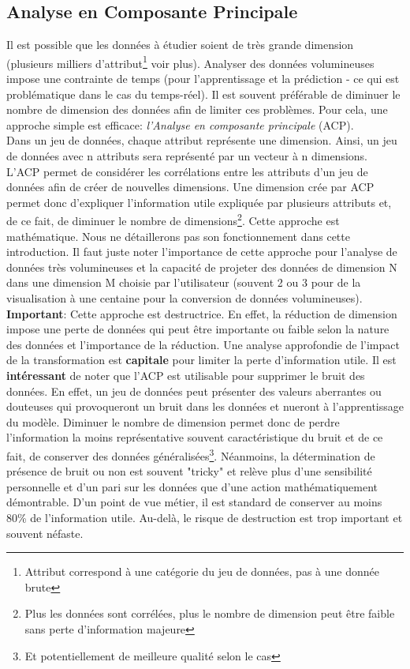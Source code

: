 \subsection{Analyse en Composante Principale}
Il est possible que les données à étudier soient de très grande dimension (plusieurs milliers d'attribut\footnote{Attribut correspond à une catégorie du jeu de données, pas à une donnée brute} voir plus). Analyser des données volumineuses impose une contrainte de temps (pour l'apprentissage et la prédiction - ce qui est problématique dans le cas du temps-réel). Il est souvent préférable de diminuer le nombre de dimension des données afin de limiter ces problèmes. Pour cela, une approche simple est efficace: \textit{l'Analyse en composante principale} (ACP). \\

\noindent Dans un jeu de données, chaque attribut représente une dimension. Ainsi, un jeu de données avec n attributs sera représenté par un vecteur à n dimensions. L'ACP permet de considérer les corrélations entre les attributs d'un jeu de données afin de créer de nouvelles dimensions. Une dimension crée par ACP permet donc d'expliquer l'information utile expliquée par plusieurs attributs et, de ce fait, de diminuer le nombre de dimensions\footnote{Plus les données sont corrélées, plus le nombre de dimension peut être faible sans perte d'information majeure}. Cette approche est mathématique. Nous ne détaillerons pas son fonctionnement dans cette introduction. Il faut juste noter l'importance de cette approche pour l'analyse de données très volumineuses et la capacité de projeter des données de dimension N dans une dimension M choisie par l'utilisateur (souvent 2 ou 3 pour de la visualisation à une centaine pour la conversion de données volumineuses).\\

 \noindent \textbf{Important}: Cette approche est destructrice. En effet, la réduction de dimension impose une perte de données qui peut être importante ou faible selon la nature des données et l'importance de la réduction. Une analyse approfondie de l'impact de la transformation est \textbf{capitale} pour limiter la perte d'information utile. Il est \textbf{intéressant} de noter que l'ACP est utilisable pour supprimer le bruit des données. En effet, un jeu de données peut présenter des valeurs aberrantes ou douteuses qui provoqueront un bruit dans les données et nueront à l'apprentissage du modèle. Diminuer le nombre de dimension permet donc de perdre l'information la moins représentative souvent caractéristique du bruit et de ce fait, de conserver des données généralisées\footnote{Et potentiellement de meilleure qualité selon le cas}. Néanmoins, la détermination de présence de bruit ou non est souvent "tricky" et relève plus d'une sensibilité personnelle et d'un pari sur les données que d'une action mathématiquement démontrable. D'un point de vue métier, il est standard de conserver au moins 80\% de l'information utile. Au-delà, le risque de destruction est trop important et souvent néfaste.